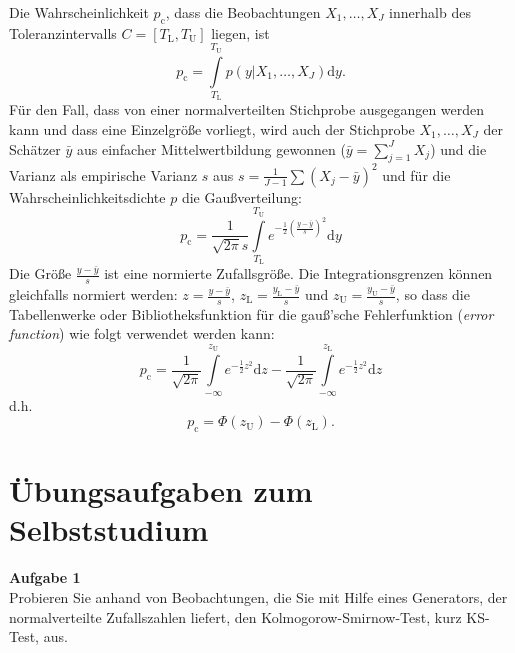 Die Wahrscheinlichkeit $p_\mathrm{c}$, dass die Beobachtungen ${X_1,\dots,X_J}$ innerhalb des Toleranzintervalls
$C = [T_\mathrm{L}, T_\mathrm{U}]$ liegen, ist
\begin{equation}
	p_\mathrm{c} =  \int\limits_{T_\mathrm{L}}^{T_\mathrm{U}} p(y|{X_1,\dots,X_J}) \mathrm{d}y.
\end{equation}
Für den Fall, dass von einer normalverteilten Stichprobe ausgegangen werden kann und dass eine Einzelgröße
vorliegt, wird auch der Stichprobe ${X_1,\dots,X_J}$ der Schätzer $\bar y$ aus einfacher Mittelwertbildung
gewonnen ($\bar y = \sum_{j=1}^J X_j$) und die Varianz als empirische Varianz $s$ aus
$s = \frac{1}{J-1}\sum (X_j - \bar y)^2$ und für die Wahrscheinlichkeitsdichte $p$ die Gaußverteilung:
\begin{equation}
	p_\mathrm{c} = \frac{1}{\sqrt{2 \pi} s} \int\limits_{T_\mathrm{L}}^{T_\mathrm{U}} 
	e^{-\frac{1}{2}\left(\frac{y - \bar y}{s}\right)^2} \mathrm{d}y
\end{equation}
Die Größe $\frac{y - \bar y}{s}$ ist eine normierte Zufallsgröße. Die Integrationsgrenzen können gleichfalls
normiert werden: $z = \frac{y - \bar y}{s}$, $z_\mathrm{L} = \frac{y_\mathrm{L} - \bar y}{s}$ und
$z_\mathrm{U} = \frac{y_\mathrm{U} - \bar y}{s}$, so dass die Tabellenwerke oder Bibliotheksfunktion
für die gauß'sche Fehlerfunktion (\textsl{error function}) wie folgt verwendet werden kann:
\begin{equation}
p_\mathrm{c} = \frac{1}{\sqrt{2 \pi}} \int\limits_{-\infty}^{z_\mathrm{U}} 
	e^{-\frac{1}{2} z^2} \mathrm{d}z - 
	\frac{1}{\sqrt{2 \pi}} \int\limits_{-\infty}^{z_\mathrm{L}} e^{-\frac{1}{2} z^2} \mathrm{d}z
\end{equation}
d.h.
\begin{equation}
	p_\mathrm{c} = \Phi(z_\mathrm{U}) - \Phi(z_\mathrm{L}).
\end{equation}


%
%


\section{Übungsaufgaben zum Selbststudium}
\label{AufgVorl5}

\textbf{Aufgabe 1}\\

Probieren Sie anhand von Beobachtungen, die Sie mit Hilfe eines Generators, der
normalverteilte Zufallszahlen liefert, den Kolmogorow-Smirnow-Test, kurz KS-Test, aus.

